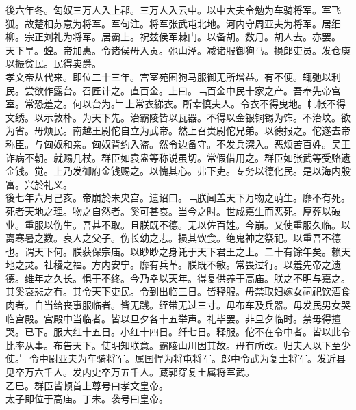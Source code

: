 \documentclass{zhvt-classic}
\begin{document}
\hspace*{2em}後六年冬。匈奴三万人入上郡。三万人入云中。以中大夫令勉为车骑将军。军飞狐。故楚相苏意为将军。军句注。将军张武屯北地。河内守周亚夫为将军。居细柳。宗正刘礼为将军。居霸上。祝兹侯军棘门。以备胡。数月。胡人去。亦罢。\\
\hspace*{2em}天下旱。蝗。帝加惠。令诸侯毋入贡。弛山泽。减诸服御狗马。损郎吏员。发仓庾以振贫民。民得卖爵。\\
\hspace*{2em}孝文帝从代来。即位二十三年。宫室苑囿狗马服御无所增益。有不便。辄弛以利民。尝欲作露台。召匠计之。直百金。上曰。﹁百金中民十家之产。吾奉先帝宫室。常恐羞之。何以台为。﹂上常衣綈衣。所幸慎夫人。令衣不得曳地。帏帐不得文绣。以示敦朴。为天下先。治霸陵皆以瓦器。不得以金银铜锡为饰。不治坟。欲为省。毋烦民。南越王尉佗自立为武帝。然上召贵尉佗兄弟。以德报之。佗遂去帝称臣。与匈奴和亲。匈奴背约入盗。然令边备守。不发兵深入。恶烦苦百姓。吴王诈病不朝。就赐几杖。群臣如袁盎等称说虽切。常假借用之。群臣如张武等受赂遗金钱。觉。上乃发御府金钱赐之。以愧其心。弗下吏。专务以德化民。是以海内殷富。兴於礼义。\\
\hspace*{2em}後七年六月己亥。帝崩於未央宫。遗诏曰。﹁朕闻盖天下万物之萌生。靡不有死。死者天地之理。物之自然者。奚可甚哀。当今之时。世咸嘉生而恶死。厚葬以破业。重服以伤生。吾甚不取。且朕既不德。无以佐百姓。今崩。又使重服久临。以离寒暑之数。哀人之父子。伤长幼之志。损其饮食。绝鬼神之祭祀。以重吾不德也。谓天下何。朕获保宗庙。以眇眇之身讬于天下君王之上。二十有馀年矣。赖天地之灵。社稷之福。方内安宁。靡有兵革。朕既不敏。常畏过行。以羞先帝之遗德。维年之久长。惧于不终。今乃幸以天年。得复供养于高庙。朕之不明与嘉之。其奚哀悲之有。其令天下吏民。令到出临三日。皆释服。毋禁取妇嫁女祠祀饮酒食肉者。自当给丧事服临者。皆无践。绖带无过三寸。毋布车及兵器。毋发民男女哭临宫殿。宫殿中当临者。皆以旦夕各十五举声。礼毕罢。非旦夕临时。禁毋得擅哭。已下。服大红十五日。小红十四日。纤七日。释服。佗不在令中者。皆以此令比率从事。布告天下。使明知朕意。霸陵山川因其故。毋有所改。归夫人以下至少使。﹂令中尉亚夫为车骑将军。属国悍为将屯将军。郎中令武为复土将军。发近县见卒万六千人。发内史卒万五千人。藏郭穿复土属将军武。\\
\hspace*{2em}乙巳。群臣皆顿首上尊号曰孝文皇帝。\\
\hspace*{2em}太子即位于高庙。丁未。袭号曰皇帝。\\
\end{document}

